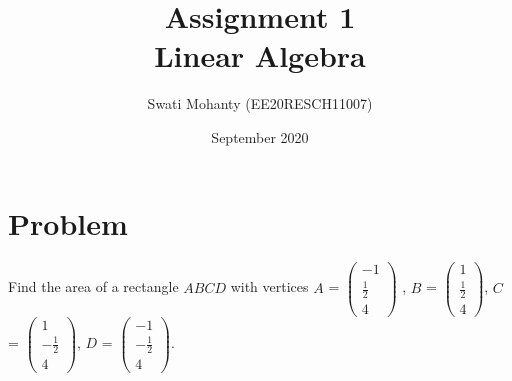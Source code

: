 \documentclass[journal,12pt,twocolumn]{IEEEtran}
\title{Assignment 1
\\Linear Algebra }
\author{Swati Mohanty (EE20RESCH11007) }
\date{September 2020}
\newcommand{\myvec}[1]{\ensuremath{\begin{pmatrix}#1\end{pmatrix}}}
\begin{document}
\maketitle


\section{Problem}
Find the area of a rectangle $ABCD$ with vertices $A$ = \myvec{-1 \\\frac{1}{2} \\4} , $B$ = \myvec{1 \\\frac{1}{2} \\4}, $C$ = \myvec{1 \\-\frac{1}{2} \\4}, $D$ = \myvec{-1 \\-\frac{1}{2} \\4}.
\end{document}
